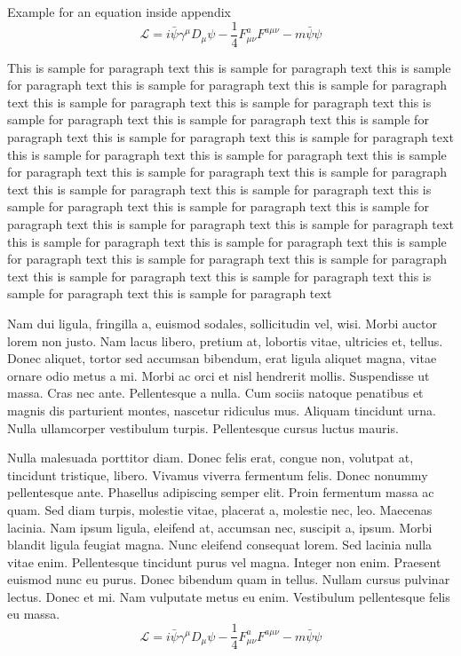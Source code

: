 \documentclass[APA,Times1COL]{WileyNJDv5} %
\begin{document}
Example for an equation inside appendix
\begin{equation}
{\mathcal{L}} = i \bar{\psi} \gamma^\mu D_\mu \psi - \frac{1}{4} F_{\mu\nu}^a F^{a\mu\nu} - m \bar{\psi} \psi\label{eq25}
\end{equation}

%
\vspace*{12pt}
This is sample for paragraph text this is sample for paragraph text  this is sample for paragraph text this is sample for paragraph text this is sample for paragraph text this is sample for paragraph text this is sample for paragraph text this is sample for paragraph text this is sample for paragraph text this is sample for paragraph text this is sample for paragraph text this is sample for paragraph text this is sample for paragraph text this is sample for paragraph text this is sample for paragraph text this is sample for paragraph text this is sample for paragraph text this is sample for paragraph text this is sample for paragraph text this is sample for paragraph text this is sample for paragraph text this is sample for paragraph text this is sample for paragraph text this is sample for paragraph text this is sample for paragraph text this is sample for paragraph text this is sample for paragraph text this is sample for paragraph text this is sample for paragraph text this is sample for paragraph text this is sample for paragraph text this is sample for paragraph text this is sample for paragraph text



Nam dui ligula, fringilla a, euismod sodales, sollicitudin vel, wisi. Morbi auctor lorem non justo. Nam lacus libero,
pretium at, lobortis vitae, ultricies et, tellus. Donec aliquet, tortor sed accumsan bibendum, erat ligula aliquet magna,
vitae ornare odio metus a mi. Morbi ac orci et nisl hendrerit mollis. Suspendisse ut massa. Cras nec ante. Pellentesque
a nulla. Cum sociis natoque penatibus et magnis dis parturient montes, nascetur ridiculus mus. Aliquam tincidunt
urna. Nulla ullamcorper vestibulum turpis. Pellentesque cursus luctus mauris.

Nulla malesuada porttitor diam. Donec felis erat, congue non, volutpat at, tincidunt tristique, libero. Vivamus
viverra fermentum felis. Donec nonummy pellentesque ante. Phasellus adipiscing semper elit. Proin fermentum massa
ac quam. Sed diam turpis, molestie vitae, placerat a, molestie nec, leo. Maecenas lacinia. Nam ipsum ligula, eleifend
at, accumsan nec, suscipit a, ipsum. Morbi blandit ligula feugiat magna. Nunc eleifend consequat lorem. Sed lacinia
nulla vitae enim. Pellentesque tincidunt purus vel magna. Integer non enim. Praesent euismod nunc eu purus. Donec
bibendum quam in tellus. Nullam cursus pulvinar lectus. Donec et mi. Nam vulputate metus eu enim. Vestibulum
pellentesque felis eu massa.
\begin{equation}
\mathcal{L} = i \bar{\psi} \gamma^\mu D_\mu \psi
    - \frac{1}{4} F_{\mu\nu}^a F^{a\mu\nu} - m \bar{\psi} \psi
\label{eq26}
\end{equation}
\end{document}
